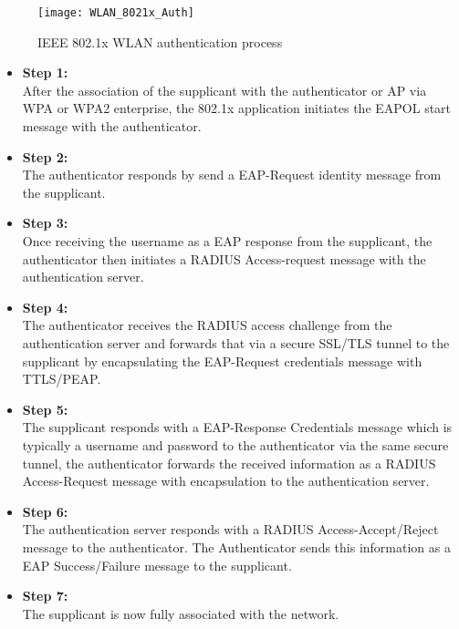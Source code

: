 \begin{figure}[H]
	\centering
	\texttt{[image: WLAN\_8021x\_Auth]}
	\caption {IEEE 802.1x WLAN authentication process \cite{WLAN_802.1x_img}}
	\label{fig:WLAN_802.1x_auth_img}
	\vspace{-10pt}
\end{figure}

\begin{itemize}
	\item \textbf{Step 1:} 
	\\ After the association of the supplicant with the authenticator or AP via WPA or WPA2 enterprise, the 802.1x application initiates the EAPOL start message with the authenticator. 
	\item \textbf{Step 2:} 
	\\ The authenticator responds by send a EAP-Request identity message from the supplicant. 
	\item \textbf{Step 3:}
	\\ Once receiving the username as a EAP response from the supplicant, the authenticator then initiates a RADIUS Access-request message with the authentication server. 
	\item \textbf{Step 4:}
	\\ The authenticator receives the RADIUS access challenge from the authentication server and forwards that via a secure SSL/TLS tunnel to the supplicant by encapsulating the EAP-Request credentials message with TTLS/PEAP.
	\item \textbf{Step 5:}
	\\ The supplicant responds with a EAP-Response Credentials message which is typically a username and password to the authenticator via the same secure tunnel, the authenticator forwards the received information as a RADIUS Access-Request message with encapsulation to the authentication server. 
	\item \textbf{Step 6:}
	\\ The authentication server responds with a RADIUS Access-Accept/Reject message to the authenticator. The Authenticator sends this information as a EAP Success/Failure message to the supplicant. 
	\item \textbf{Step 7:}
	\\ The supplicant is now fully associated with the network.
	
\end{itemize}

